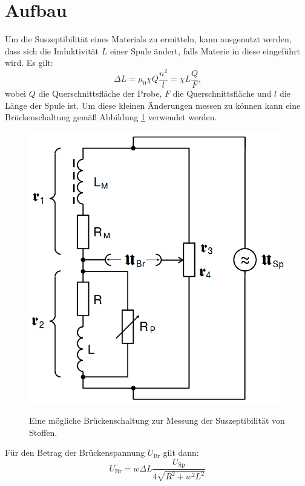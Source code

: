 \section{Aufbau}
\label{sec:Aufbau}

Um die Suszeptibilität eines Materials zu ermitteln, kann ausgenutzt werden, dass sich die Induktivität $L$ einer Spule ändert, falls Materie in diese eingeführt wird. Es gilt:
\begin{equation}
	\Delta L = \mu_0 \chi Q \frac{n^2}{l}=\chi L \frac{Q}{F}\text{,}
\end{equation}
wobei $Q$ die Querschnittsfläche der Probe, $F$ die Querschnittsfläche und $l$ die Länge der Spule ist. Um diese kleinen Änderungen messen zu können kann eine Brückenschaltung gemäß Abbildung \ref{fig:Brueckenschaltung} verwendet werden.
\begin{figure}
	\centering
	\caption{Eine mögliche Brückenschaltung zur Messung der Suszeptibilität von Stoffen.}
	\includegraphics[width=\linewidth-70pt,height=\textwidth-200pt,keepaspectratio]{content/images/Brueckenschaltung.png}
	\label{fig:Brueckenschaltung}
\end{figure}
Für den Betrag der Brückenspannung $U_\text{Br}$ gilt dann:
\begin{equation}
	U_\text{Br} = w \Delta L \frac{U_\text{Sp}}{4 \sqrt{R^2+w^2L^2}}
\end{equation}
